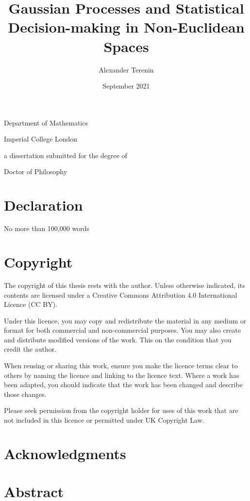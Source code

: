\documentclass[11pt]{book}
\title{Gaussian Processes and Statistical Decision-making in Non-Euclidean Spaces}
\author{Alexander Terenin}
\date{September 2021}
\begin{document}
\begin{titlepage}
\maketitlehooka
\centering
\huge
\null
\vfill
\thetitle
\par
\vfill
\LARGE
\theauthor
\par
\large
Department of Mathematics
\par
Imperial College London
\par
\vfill
\null
\vfill
a dissertation submitted for the degree of
\par
Doctor of Philosophy
\par
\strut
\par
\thedate
\par
\vfill
\null
\maketitlehookd
\end{titlepage}

\chapter*{Declaration}

No more than 100,000 words

\chapter*{Copyright}

The copyright of this thesis rests with the author. Unless otherwise indicated, its contents are licensed under a Creative Commons Attribution 4.0 International Licence (CC BY).

Under this licence, you may copy and redistribute the material in any medium or format for both commercial and non-commercial purposes. You may also create and distribute modified versions of the work. This on the condition that you credit the author.

When reusing or sharing this work, ensure you make the licence terms clear to others by naming the licence and linking to the licence text. Where a work has been adapted, you should indicate that the work has been changed and describe those changes.

Please seek permission from the copyright holder for uses of this work that are not included in this licence or permitted under UK Copyright Law.

\chapter*{Acknowledgments}

\chapter*{Abstract}
\end{document}
